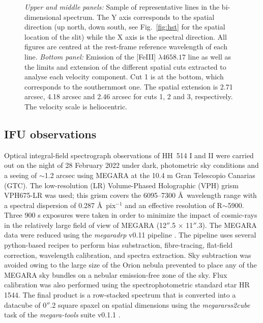 \documentclass[fleqn,usenatbib]{mnras}
\begin{document}
\begin{figure}
\caption{\textit{Upper and middle panels:} Sample of representative lines in the bi-dimensional spectrum. The Y axis corresponds to the spatial direction (up north, down south, see Fig.~\ref{fig:hst} for the spatial location of the slit) while the X axis is the spectral direction. All figures are centred at the rest-frame reference wavelength of each line. \textit{Bottom panel:} Emission of the [Fe\thinspace III] $\lambda 4658.17$ line as well as the limits and extension of the different spatial cuts extracted to analyse each velocity component. Cut 1 is at the bottom, which corresponds to the southernmost one. The spatial extension is 2.71 arcsec, 4.18 arcsec and 2.46 arcsec for cuts 1, 2 and 3, respectively. The velocity scale is heliocentric.}
\label{fig:cuts}
\end{figure}

\subsection{IFU observations}
\label{sec:data_megara}

Optical integral-field spectrograph observations of HH~514 I and II were carried out on the night of 28 February 2022 under dark, photometric sky conditions and a seeing of $\sim$1.2 arcsec using MEGARA \citep{gildepaz+18} at the 10.4 m Gran Telescopio Canarias (GTC). The low-resolution (LR) Volume-Phased Holographic (VPH) grism VPH675-LR was used; this grism covers the 6095--7300 \AA\ wavelength range  with a spectral dispersion of 0.287 \AA\ pix$^{-1}$ and an effective resolution of R$\sim$5900. Three 900 s exposures were taken in order to minimize the impact of cosmic-rays in the relatively large field of view of MEGARA (12$''$.5 $\times$ 11$''$.3). 
The MEGARA data were reduced using the {\it megaradrp} v0.11 pipeline \citep{pascual+19, pascual+20}. The pipeline uses several python-based recipes to perform bias substraction, fibre-tracing,  flat-field correction, wavelength calibration, and spectra extraction. Sky subtraction was avoided owing to the large size of the Orion nebula prevented to place any of the MEGARA sky bundles on a nebular emission-free zone of the sky. Flux calibration was also performed using the spectrophotometric standard star HR\,1544. The final product is a row-stacked spectrum that is converted into a datacube of 0$''$.2 square spaxel on spatial dimensions using the {\it megararss2cube} task of the {\it megara-tools} suite v0.1.1 \citep{gildepaz+20}. 
\end{document}
